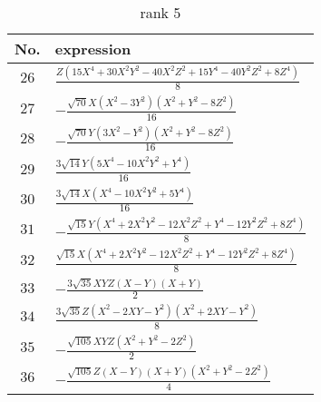 \documentclass[fleqn,8pt,landscape]{jsarticle}
\begin{document}
\begin{table}[ht!]
\begin{center}
\caption{rank 5}
\renewcommand{\arraystretch}{1.3}
\begin{tabular}{cl} \hline \hline
No. & expression \\ \hline
$ 26 $ & $ \frac{Z \left(15 X^{4} + 30 X^{2} Y^{2} - 40 X^{2} Z^{2} + 15 Y^{4} - 40 Y^{2} Z^{2} + 8 Z^{4}\right)}{8} $ \\
$ 27 $ & $ - \frac{\sqrt{70} X \left(X^{2} - 3 Y^{2}\right) \left(X^{2} + Y^{2} - 8 Z^{2}\right)}{16} $ \\
$ 28 $ & $ - \frac{\sqrt{70} Y \left(3 X^{2} - Y^{2}\right) \left(X^{2} + Y^{2} - 8 Z^{2}\right)}{16} $ \\
$ 29 $ & $ \frac{3 \sqrt{14} Y \left(5 X^{4} - 10 X^{2} Y^{2} + Y^{4}\right)}{16} $ \\
$ 30 $ & $ \frac{3 \sqrt{14} X \left(X^{4} - 10 X^{2} Y^{2} + 5 Y^{4}\right)}{16} $ \\
$ 31 $ & $ - \frac{\sqrt{15} Y \left(X^{4} + 2 X^{2} Y^{2} - 12 X^{2} Z^{2} + Y^{4} - 12 Y^{2} Z^{2} + 8 Z^{4}\right)}{8} $ \\
$ 32 $ & $ \frac{\sqrt{15} X \left(X^{4} + 2 X^{2} Y^{2} - 12 X^{2} Z^{2} + Y^{4} - 12 Y^{2} Z^{2} + 8 Z^{4}\right)}{8} $ \\
$ 33 $ & $ - \frac{3 \sqrt{35} X Y Z \left(X - Y\right) \left(X + Y\right)}{2} $ \\
$ 34 $ & $ \frac{3 \sqrt{35} Z \left(X^{2} - 2 X Y - Y^{2}\right) \left(X^{2} + 2 X Y - Y^{2}\right)}{8} $ \\
$ 35 $ & $ - \frac{\sqrt{105} X Y Z \left(X^{2} + Y^{2} - 2 Z^{2}\right)}{2} $ \\
$ 36 $ & $ - \frac{\sqrt{105} Z \left(X - Y\right) \left(X + Y\right) \left(X^{2} + Y^{2} - 2 Z^{2}\right)}{4} $ \\
 \hline \hline
\end{tabular}
\end{center}
\end{table}
\end{document}
